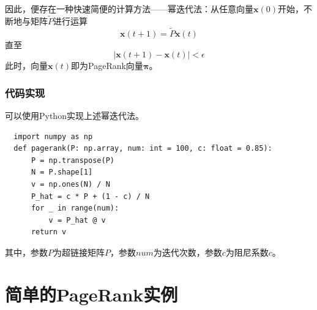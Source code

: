 \documentclass[UTF8,openany]{ctexbook}
\begin{document}
因此，便存在一种快速简便的计算方法——幂迭代法：从任意向量$\boldsymbol{x}(0)$开始，不断地与矩阵$\widetilde{P}$进行运算
\begin{equation}
    \boldsymbol{x}(t+1)=\widetilde{P}\boldsymbol{x}(t)
\end{equation}
直至
\begin{equation}
    |\boldsymbol{x}(t+1)-\boldsymbol{x}(t)|<\epsilon
\end{equation}
此时，向量$\boldsymbol{x}(t)$即为PageRank向量$\boldsymbol{\pi}$。

\subsection[代码实现]{代码实现}
可以使用Python实现上述幂迭代法。

\begin{lstlisting}
  import numpy as np
  def pagerank(P: np.array, num: int = 100, c: float = 0.85):
      P = np.transpose(P)
      N = P.shape[1]
      v = np.ones(N) / N
      P_hat = c * P + (1 - c) / N
      for _ in range(num):
          v = P_hat @ v
      return v
\end{lstlisting}
其中，参数$P$为超链接矩阵$P$，参数$num$为迭代次数，参数$c$为阻尼系数$c$。

\chapter[简单的PageRank实例]{简单的PageRank实例}
\thispagestyle{fancy}
\end{document}
